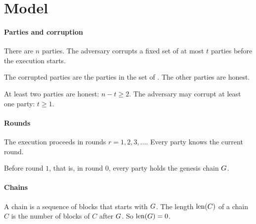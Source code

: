 \section{Model}\label{sec.model}

\paragraph{Parties and corruption}

\begin{assumption}\label{asm.static-corruption}
There are $n$ parties.
The adversary corrupts a fixed set of at most $t$ parties before the execution starts.
\end{assumption}

\begin{definition}\label{def.honest-corrupted}
The corrupted parties are the parties in the set of .
The other parties are honest.
\end{definition}

\begin{assumption}\label{asm.corruption-bounds}
At least two parties are honest: $n - t \geq 2$.
The adversary may corrupt at least one party: $t \geq 1$.
\end{assumption}

\paragraph{Rounds}

\begin{assumption}[Rounds]\label{asm.rounds}
The execution proceeds in rounds $r = 1, 2, 3, \dots$.
Every party knows the current round.
\end{assumption}

\begin{assumption}[Genesis]\label{asm.genesis}
Before round $1$, that is, in round $0$, every party holds the genesis chain $G$.
\end{assumption}

\paragraph{Chains}

\begin{definition}\label{def.chain-length}
A chain is a sequence of blocks that starts with $G$.
The length $\operatorname{len}(C)$ of a chain $C$ is the number of blocks of $C$ after $G$.
So $\operatorname{len}(G) = 0$.
\end{definition}

